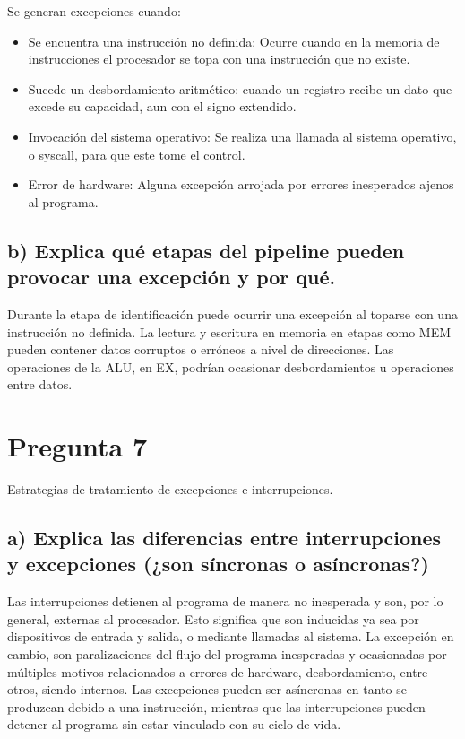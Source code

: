\documentclass[12pt]{article}
\begin{document}
Se generan excepciones cuando:
\begin{itemize}
    \item Se encuentra una instrucción no definida: Ocurre cuando en la memoria de instrucciones el procesador se topa con una instrucción que no existe.
    \item Sucede un desbordamiento aritmético: cuando un registro recibe un dato que excede su capacidad, aun con el signo extendido.
    \item Invocación del sistema operativo: Se realiza una llamada al sistema operativo, o syscall, para que este tome el control.
    \item Error de hardware: Alguna excepción arrojada por errores inesperados ajenos al programa.
\end{itemize}

\subsection*{b) Explica qué etapas del pipeline pueden provocar una excepción y por qué.}

Durante la etapa de identificación puede ocurrir una excepción al toparse con una instrucción no definida. La lectura y escritura en memoria en etapas como MEM pueden contener datos corruptos o erróneos a nivel de direcciones. Las operaciones de la ALU, en EX, podrían ocasionar desbordamientos u operaciones entre datos.

\section*{Pregunta 7}
Estrategias de tratamiento de excepciones e interrupciones.

\subsection*{a) Explica las diferencias entre interrupciones y excepciones (¿son síncronas o asíncronas?)}

Las interrupciones detienen al programa de manera no inesperada y son, por lo general, externas al procesador. Esto significa que son inducidas ya sea por dispositivos de entrada y salida, o mediante llamadas al sistema. La excepción en cambio, son paralizaciones del flujo del programa inesperadas y ocasionadas por múltiples motivos relacionados a errores de hardware, desbordamiento, entre otros, siendo internos. Las excepciones pueden ser asíncronas en tanto se produzcan debido a una instrucción, mientras que las interrupciones pueden detener al programa sin estar vinculado con su ciclo de vida.
\end{document}
